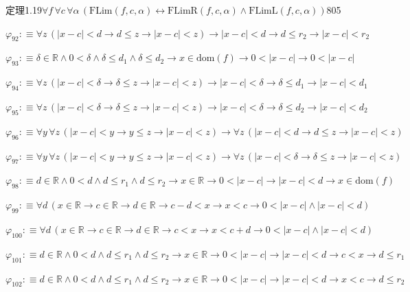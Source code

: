 \begin{fullproof}{定理1.19}{$\forall f\,\forall c\,\forall \alpha\,(\mathrm{FLim}(f,c,\alpha) \leftrightarrow \mathrm{FLimR}(f,c,\alpha) \land \mathrm{FLimL}(f,c,\alpha))$}{805}
\begin{abbrevlist}
\item $\varphi_{92} :\equiv \forall z\,(\lvert x - c \rvert < d \to d \leq z \to \lvert x - c \rvert < z) \to \lvert x - c \rvert < d \to d \leq r_{2} \to \lvert x - c \rvert < r_{2}$
\item $\varphi_{93} :\equiv \delta \in \mathbb{R} \land 0 < \delta \land \delta \leq d_{1} \land \delta \leq d_{2} \to x \in \mathrm{dom}(f) \to 0 < \lvert x - c \rvert \to 0 < \lvert x - c \rvert$
\item $\varphi_{94} :\equiv \forall z\,(\lvert x - c \rvert < \delta \to \delta \leq z \to \lvert x - c \rvert < z) \to \lvert x - c \rvert < \delta \to \delta \leq d_{1} \to \lvert x - c \rvert < d_{1}$
\item $\varphi_{95} :\equiv \forall z\,(\lvert x - c \rvert < \delta \to \delta \leq z \to \lvert x - c \rvert < z) \to \lvert x - c \rvert < \delta \to \delta \leq d_{2} \to \lvert x - c \rvert < d_{2}$
\item $\varphi_{96} :\equiv \forall y\,\forall z\,(\lvert x - c \rvert < y \to y \leq z \to \lvert x - c \rvert < z) \to \forall z\,(\lvert x - c \rvert < d \to d \leq z \to \lvert x - c \rvert < z)$
\item $\varphi_{97} :\equiv \forall y\,\forall z\,(\lvert x - c \rvert < y \to y \leq z \to \lvert x - c \rvert < z) \to \forall z\,(\lvert x - c \rvert < \delta \to \delta \leq z \to \lvert x - c \rvert < z)$
\item $\varphi_{98} :\equiv d \in \mathbb{R} \land 0 < d \land d \leq r_{1} \land d \leq r_{2} \to x \in \mathbb{R} \to 0 < \lvert x - c \rvert \to \lvert x - c \rvert < d \to x \in \mathrm{dom}(f)$
\item $\varphi_{99} :\equiv \forall d\,(x \in \mathbb{R} \to c \in \mathbb{R} \to d \in \mathbb{R} \to c - d < x \to x < c \to 0 < \lvert x - c \rvert \land \lvert x - c \rvert < d)$
\item $\varphi_{100} :\equiv \forall d\,(x \in \mathbb{R} \to c \in \mathbb{R} \to d \in \mathbb{R} \to c < x \to x < c + d \to 0 < \lvert x - c \rvert \land \lvert x - c \rvert < d)$
\item $\varphi_{101} :\equiv d \in \mathbb{R} \land 0 < d \land d \leq r_{1} \land d \leq r_{2} \to x \in \mathbb{R} \to 0 < \lvert x - c \rvert \to \lvert x - c \rvert < d \to c < x \to d \leq r_{1}$
\item $\varphi_{102} :\equiv d \in \mathbb{R} \land 0 < d \land d \leq r_{1} \land d \leq r_{2} \to x \in \mathbb{R} \to 0 < \lvert x - c \rvert \to \lvert x - c \rvert < d \to x < c \to d \leq r_{2}$

\end{abbrevlist}
\end{fullproof}
